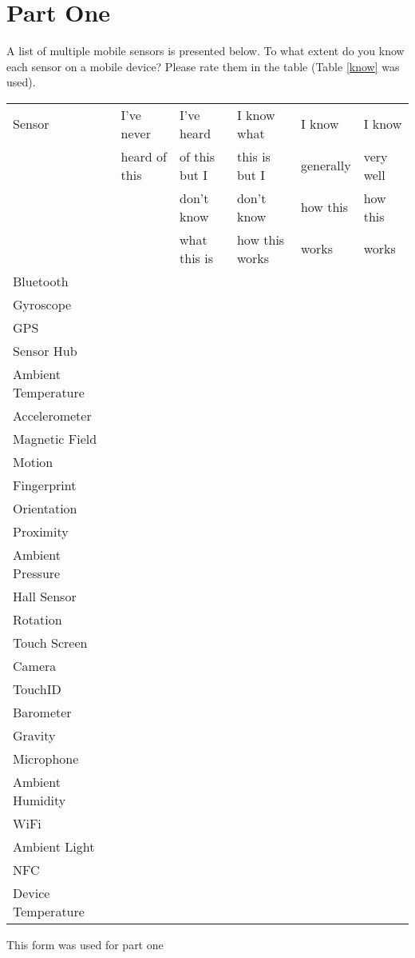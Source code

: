 \documentclass[10pt,twocolumn]{article}
\begin{document}
\section*{Part One}
A list of multiple mobile sensors is presented below. 
To what extent do you know each sensor on a mobile device? Please rate them in the table (Table \ref{know} was used).
\begin {table*}[t]
\begin{center}
\begin{tabular}{ |l||l|l|l|l|l|} 
 \hline
 Sensor& 
 I've never & 
 I've heard & 
 I know what & 
 I know  & 
 I know \\ 
 
  & heard of this  
  & of this but I 
  & this is but I
  & generally  
  & very well \\ 
  
  &
  & 
  don't know& 
  don't know&
  how this  &
  how this 
  \\
  
  &
  &
  what this is
  & how this works
  & works
  & works
  \\\hline
Bluetooth&&&&&\\ \hline
Gyroscope&&&&&\\ \hline
GPS&&&&&\\ \hline
Sensor Hub&&&&&\\ \hline
Ambient Temperature&&&&&\\ 
\hline
Accelerometer&&&&&\\ \hline
Magnetic Field&&&&&\\ \hline
Motion&&&&&\\ \hline
Fingerprint&&&&&\\ \hline
Orientation&&&&&\\ \hline
Proximity &&&&&\\ \hline
Ambient Pressure&&&&&\\ 
\hline
Hall Sensor&&&&&\\ \hline
Rotation&&&&&\\ \hline
Touch Screen&&&&&\\ \hline
Camera&&&&&\\  \hline
TouchID &&&&&\\ \hline
Barometer&&&&&\\ \hline
Gravity&&&&&\\ \hline
Microphone&&&&&\\ \hline
Ambient Humidity&&&&&\\
\hline
WiFi&&&&&\\ \hline
Ambient Light&&&&&\\ \hline
NFC&&&&&\\ \hline
Device Temperature&&&&&\\
\hline
\end{tabular}
\caption{This form was used for part one}
\label{know}
\end{center}
\end {table*}
\end{document}
